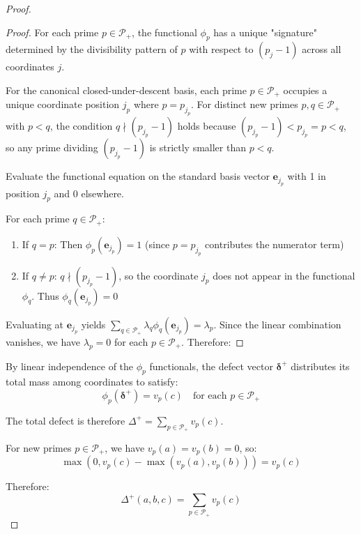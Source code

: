 \begin{proof}
\begin{proof}
For each prime $p \in \mathcal{P}_+$, the functional $\phi_p$ has a unique "signature" determined by the divisibility pattern of $p$ with respect to $(p_j - 1)$ across all coordinates $j$.

For the canonical closed-under-descent basis, each prime $p \in \mathcal{P}_+$ occupies a unique coordinate position $j_p$ where $p = p_{j_p}$. For distinct new primes $p, q \in \mathcal{P}_+$ with $p < q$, the condition $q \nmid (p_{j_p} - 1)$ holds because $(p_{j_p} - 1) < p_{j_p} = p < q$, so any prime dividing $(p_{j_p} - 1)$ is strictly smaller than $p < q$.

Evaluate the functional equation on the standard basis vector $\mathbf{e}_{j_p}$ with 1 in position $j_p$ and 0 elsewhere.

For each prime $q \in \mathcal{P}_+$:
\begin{enumerate}
\item If $q = p$: Then $\phi_p(\mathbf{e}_{j_p}) = 1$ (since $p = p_{j_p}$ contributes the numerator term)
\item If $q \neq p$: $q \nmid (p_{j_p} - 1)$, so the coordinate $j_p$ does not appear in the functional $\phi_q$. Thus $\phi_q(\mathbf{e}_{j_p}) = 0$
\end{enumerate}

Evaluating at $\mathbf{e}_{j_p}$ yields $\sum_{q \in \mathcal{P}_+} \lambda_q \phi_q(\mathbf{e}_{j_p}) = \lambda_p$. Since the linear combination vanishes, we have $\lambda_p = 0$ for each $p \in \mathcal{P}_+$. Therefore:
\end{proof}

By linear independence of the $\phi_p$ functionals, the defect vector $\boldsymbol{\delta}^+$ distributes its total mass among coordinates to satisfy:
\begin{equation}
\phi_p(\boldsymbol{\delta}^+) = v_p(c) \quad \text{for each } p \in \mathcal{P}_+
\end{equation}

The total defect is therefore $\Delta^+ = \sum_{p \in \mathcal{P}_+} v_p(c)$.

For new primes $p \in \mathcal{P}_+$, we have $v_p(a) = v_p(b) = 0$, so:
\begin{equation}
\max(0, v_p(c) - \max(v_p(a), v_p(b))) = v_p(c)
\end{equation}

Therefore:
\begin{equation}
\Delta^+(a,b,c) = \sum_{p \in \mathcal{P}_+} v_p(c)
\end{equation}

\end{proof}

